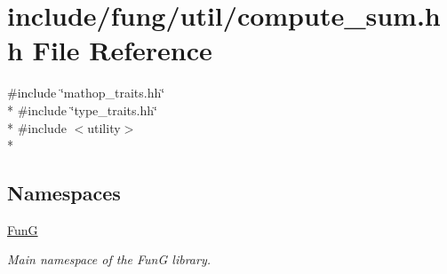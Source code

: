 \hypertarget{compute__sum_8hh}{\section{include/fung/util/compute\-\_\-sum.hh File Reference}
\label{compute__sum_8hh}
}
{\ttfamily \#include \char`\"{}mathop\-\_\-traits.\-hh\char`\"{}}\\*
{\ttfamily \#include \char`\"{}type\-\_\-traits.\-hh\char`\"{}}\\*
{\ttfamily \#include $<$utility$>$}\\*
\subsection*{Namespaces}
\begin{DoxyCompactItemize}
\item 
\hyperlink{namespaceFunG}{Fun\-G}
\begin{DoxyCompactList}\small\item\em Main namespace of the Fun\-G library. \end{DoxyCompactList}\end{DoxyCompactItemize}
